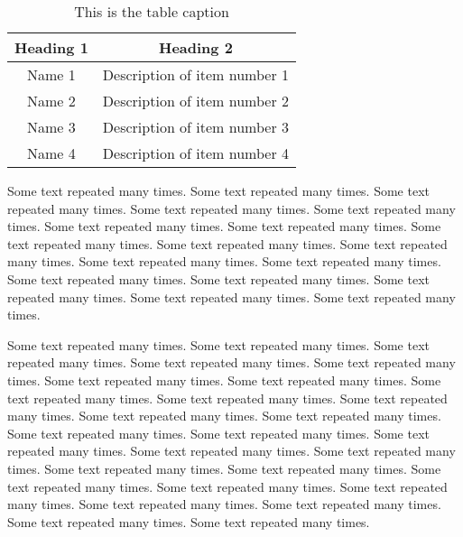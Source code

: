 \begin{table}
\begin{center}
\begin{tabular}{|c|c|} \hline
Heading 1 & Heading 2 \\ \hline
Name 1 & Description of item number 1 \\ 
Name 2 & Description of item number 2 \\ 
Name 3 & Description of item number 3 \\ 
Name 4 & Description of item number 4 \\ \hline
\end{tabular}
\end{center}
\caption[This is the table label]{This is the table caption}
\label{t:tablelable}
\end{table}

Some text repeated many times. Some text repeated many times. Some text repeated many times. Some text repeated many times. Some text repeated many times. Some text repeated many times. Some text repeated many times. Some text repeated many times. Some text repeated many times. Some text repeated many times. Some text repeated many times. Some text repeated many times. Some text repeated many times. Some text repeated many times. Some text repeated many times. Some text repeated many times. Some text repeated many times. 


Some text repeated many times. Some text repeated many times. Some text repeated many times. Some text repeated many times. Some text repeated many times. Some text repeated many times. Some text repeated many times. Some text repeated many times. Some text repeated many times. Some text repeated many times. Some text repeated many times. Some text repeated many times. Some text repeated many times. Some text repeated many times. Some text repeated many times. Some text repeated many times. Some text repeated many times. Some text repeated many times. Some text repeated many times. Some text repeated many times. Some text repeated many times. Some text repeated many times. Some text repeated many times. Some text repeated many times. Some text repeated many times. Some text repeated many times. 

